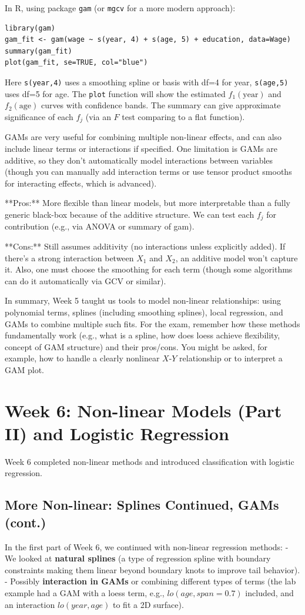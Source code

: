 \documentclass[11pt]{article}
\begin{document}
In R, using package \texttt{gam} (or \texttt{mgcv} for a more modern approach):
\begin{verbatim}
library(gam)
gam_fit <- gam(wage ~ s(year, 4) + s(age, 5) + education, data=Wage)
summary(gam_fit)
plot(gam_fit, se=TRUE, col="blue")
\end{verbatim}
Here \texttt{s(year,4)} uses a smoothing spline or basis with df=4 for year, \texttt{s(age,5)} uses df=5 for age. The \texttt{plot} function will show the estimated $f_1(\text{year})$ and $f_2(\text{age})$ curves with confidence bands. The summary can give approximate significance of each $f_j$ (via an $F$ test comparing to a flat function).

GAMs are very useful for combining multiple non-linear effects, and can also include linear terms or interactions if specified. One limitation is GAMs are additive, so they don't automatically model interactions between variables (though you can manually add interaction terms or use tensor product smooths for interacting effects, which is advanced).

**Pros:** More flexible than linear models, but more interpretable than a fully generic black-box because of the additive structure. We can test each $f_j$ for contribution (e.g., via ANOVA or summary of gam).

**Cons:** Still assumes additivity (no interactions unless explicitly added). If there's a strong interaction between $X_1$ and $X_2$, an additive model won't capture it. Also, one must choose the smoothing for each term (though some algorithms can do it automatically via GCV or similar).

In summary, Week 5 taught us tools to model non-linear relationships: using polynomial terms, splines (including smoothing splines), local regression, and GAMs to combine multiple such fits. For the exam, remember how these methods fundamentally work (e.g., what is a spline, how does loess achieve flexibility, concept of GAM structure) and their pros/cons. You might be asked, for example, how to handle a clearly nonlinear $X$-$Y$ relationship or to interpret a GAM plot.

\section{Week 6: Non-linear Models (Part II) and Logistic Regression}
Week 6 completed non-linear methods and introduced classification with logistic regression.

\subsection{More Non-linear: Splines Continued, GAMs (cont.)}
In the first part of Week 6, we continued with non-linear regression methods:
- We looked at \textbf{natural splines} (a type of regression spline with boundary constraints making them linear beyond boundary knots to improve tail behavior).
- Possibly \textbf{interaction in GAMs} or combining different types of terms (the lab example had a GAM with a loess term, e.g., $lo(age, span=0.7)$ included, and an interaction $lo(year, age)$ to fit a 2D surface).
\end{document}
